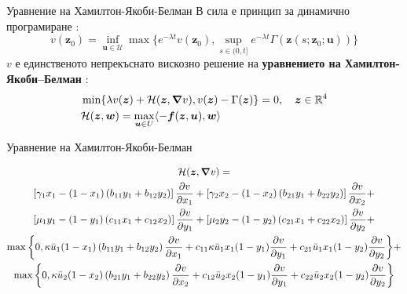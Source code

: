 \begin{frame}[t]{Уравнение на Хамилтон-Якоби-Белман}
  В сила е принцип за динамично програмиране \cite{Zidani2013}:
  \begin{equation*}
    v(\boldsymbol{z}_0) = \inf_{\boldsymbol{u} \in \mathscr{U}} \max\{e^{-\lambda t} v(\boldsymbol{z}_0), \sup_{s \in (0, t]} e^{-\lambda t} \Gamma(\boldsymbol{z}(s; \boldsymbol{z}_0; \boldsymbol{u}))\}
  \end{equation*}
  $v$ е единственото непрекъснато вискозно решение на \textbf{уравнението на Хамилтон-Якоби–Белман} \cite{Zidani2013}:
  \begin{equation}
    \begin{split}
      \label{eq:HJB}
      &\min\{\lambda v(\boldsymbol{z}) + \mathcal{H}(\boldsymbol{z}, \grad{v}), v(\boldsymbol{z}) - \Gamma(\boldsymbol{z}) \} = 0, \quad \boldsymbol{z} \in \mathbb{R}^4 \\
      &\mathcal{H}(\boldsymbol{z}, \boldsymbol{w}) = \max_{\boldsymbol{u} \in U} \langle -\boldsymbol{f}(\boldsymbol{z}, \boldsymbol{u}), \boldsymbol{w} \rangle
    \end{split}
  \end{equation}
\end{frame}

\begin{frame}[t]{Уравнение на Хамилтон-Якоби-Белман}
\begin{footnotesize}
  \begin{multline*}
    \label{eq:HamiltonianShort}
    \mathcal{H}(\boldsymbol{z}, \grad{v}) = \\
    \left[\gamma_1 x_1 - (1-x_1) \left(b_{11} y_1 + b_{12} y_2\right) \right] \pdv{v}{x_1} +
    \left[\gamma_2 x_2 - (1-x_2) \left(b_{21} y_1 + b_{22} y_2\right) \right] \pdv{v}{x_2} + \\
    \left[\mu_1 y_1 - (1-y_1) \left(c_{11} x_1 + c_{12} x_2\right) \right] \pdv{v}{y_1} +
    \left[\mu_2 y_2 - (1-y_2) \left(c_{21} x_1 + c_{22} x_2\right)\right] \pdv{v}{y_2} + \\
    \max\bigg\{0, \kappa \bar{u}_1 (1-x_1) \left(b_{11} y_1 + b_{12} y_2\right) \pdv{v}{x_1} + c_{11} \kappa \bar{u}_1 x_1 (1-y_1)\pdv{v}{y_1} + c_{21} \bar{u}_1 x_1 (1-y_2) \pdv{v}{y_2}
    \bigg\} + \\
    \max\bigg\{0, \kappa \bar{u}_2 (1-x_2) \left(b_{21} y_1 + b_{22} y_2\right) \pdv{v}{x_2} + c_{12} \bar{u}_2 x_2 (1-y_1)\pdv{v}{y_1} + c_{22}  \bar{u}_2 x_2 (1-y_2)\pdv{v}{y_2} \bigg\}
  \end{multline*}
  
  \end{footnotesize}
\end{frame}

